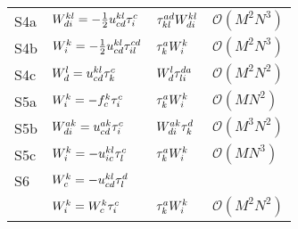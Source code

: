 \begin{center}
\begin{longtable}{@{}llll@{}}
                S4a
                & $W^{kl}_{di} = -\frac{1}{2}u^{kl}_{cd} \tau^{c}_{i}$
                & $\tau^{ad}_{kl} W^{kl}_{di}$
                & $\mathcal{O}(M^2 N^3)$ \\

                S4b
                & $W^{k}_{i} = -\frac{1}{2} u^{kl}_{cd} \tau^{cd}_{il}$
                & $\tau^{a}_{k} W^{k}_{i}$
                & $\mathcal{O}(M^2 N^3)$ \\

                S4c
                & $W^{l}_{d} = u^{kl}_{cd} \tau^{c}_{k}$
                & $W^{l}_{d} \tau^{da}_{li}$
                & $\mathcal{O}(M^2 N^2)$ \\

                S5a
                & $W^{k}_{i} = -f^{k}_{c} \tau^{c}_{i}$
                & $\tau^{a}_{k} W^{k}_{i}$
                & $\mathcal{O}(M N^2)$ \\

                S5b
                & $W^{ak}_{di} = u^{ak}_{cd} \tau^{c}_{i}$
                & $W^{ak}_{di} \tau^{d}_{k}$
                & $\mathcal{O}(M^3 N^2)$ \\

                S5c
                & $W^{k}_{i} = -u^{kl}_{ic} \tau^{c}_{l}$
                & $\tau^{a}_{k} W^{k}_{i}$
                & $\mathcal{O}(M N^3)$ \\

                S6
                & $W^{k}_{c} = -u^{kl}_{cd} \tau^{d}_{l}$ \\
                & $W^{k}_{i} = W^{k}_{c} \tau^{c}_{i}$
                & $\tau^{a}_{k} W^{k}_{i}$
                & $\mathcal{O}(M^2 N^2)$ \\
            \end{longtable}
        \end{center}

